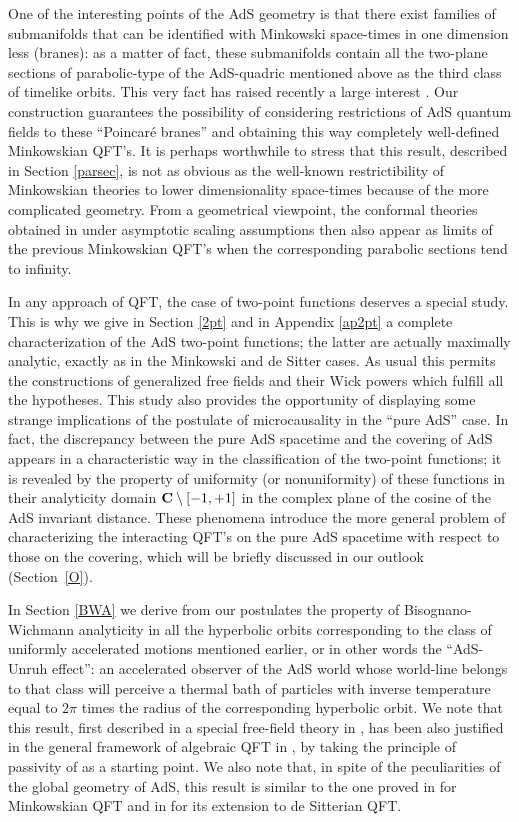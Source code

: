 \documentclass[a4paper,a4paper]{article}
\begin{document}
One of the interesting points of the AdS geometry is that
there
exist families of submanifolds that can be identified with Minkowski
space-times in one dimension less (branes): as a matter of fact,
these submanifolds contain all the
two-plane sections of parabolic-type of the AdS-quadric
mentioned above as the third class of timelike orbits.
This very fact has
raised recently a large interest \cite{maldacena,RS}. Our
construction guarantees the possibility of considering
restrictions of AdS quantum fields to these ``Poincar\'e branes'' and
obtaining this way completely well-defined Minkowskian QFT's. It
is perhaps worthwhile to stress that this result, described in
Section \ref{parsec}, is not as obvious as the well-known
restrictibility of Minkowskian theories to lower dimensionality
space-times because of the more complicated geometry.
{}From a geometrical viewpoint, the conformal theories obtained
in \cite{BBMS} under asymptotic scaling assumptions
then also appear as limits of the previous Minkowskian
QFT's when the corresponding parabolic sections tend to infinity.

In any approach of QFT, the case of two-point functions
deserves a special study.
This is why we give in Section \ref{2pt} and in Appendix \ref{ap2pt}
a  complete characterization of
the AdS two-point functions; the latter are actually maximally analytic,
exactly as in the Minkowski \cite{SW} and de Sitter \cite{BM,BEM}
cases. As usual this permits the constructions of generalized
free fields and their Wick powers which fulfill all the hypotheses.
This study also provides the opportunity of displaying
some strange implications of the postulate of microcausality
in the ``pure AdS'' case. In fact, the discrepancy between the pure
AdS spacetime and the covering of AdS appears in a
characteristic way in the classification of the two-point functions;
it is revealed by the property of uniformity (or nonuniformity) of these
functions in their
analyticity domain ${\bf C}\setminus [-1,+1]$  in the complex plane of the
cosine of the AdS invariant distance.
These phenomena introduce the more general problem of characterizing
the interacting QFT's
on the pure AdS spacetime with respect to those on the covering,
which will be briefly discussed in our outlook (Section~\ref{O}).

In Section \ref{BWA} we derive from our postulates
the property of Bisognano-Wichmann analyticity in
all the hyperbolic orbits corresponding to
the class of uniformly accelerated
motions mentioned earlier, or in other words the
``AdS-Unruh effect'':
an accelerated
observer of the AdS world whose world-line belongs to that class
will perceive a thermal bath of particles with inverse temperature
equal to $2\pi$ times the radius of the corresponding
hyperbolic orbit. We note that this result, first described
in a special free-field theory in \cite{Deser},
has been also justified in the general framework of
algebraic QFT
in \cite{BFS},
by taking the principle of passivity of \cite{PW}
as a starting point. We also note that,
in spite of the peculiarities of the global geometry of AdS,
this result is similar
to the one proved in
\cite{BW} for Minkowskian QFT
and in \cite{BEM} for its extension to de Sitterian QFT.
\end{document}
